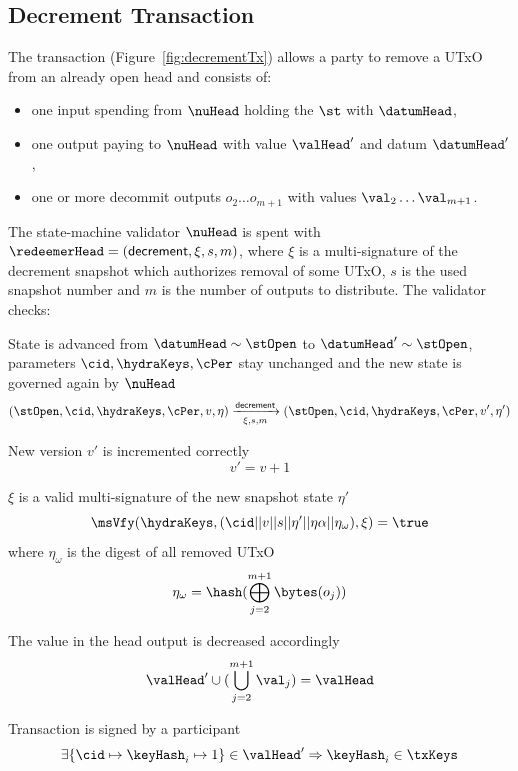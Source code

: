 \subsection{Decrement Transaction}\label{sec:decrement-tx}

\noindent The \mtxDecrement{} transaction (Figure~\ref{fig:decrementTx}) allows
a party to remove a UTxO from an already open head and consists of:

\begin{itemize}
  \item one input spending from $\nuHead$ holding the $\st$ with $\datumHead$,
  \item one output paying to $\nuHead$ with value $\valHead'$ and
  datum $\datumHead'$,
  \item one or more decommit outputs $o_{2} \dots o_{m+1}$ with values $\val_{2} \dots \val_{m+1} $.
\end{itemize}

\noindent The state-machine validator $\nuHead$ is spent with
$\redeemerHead = (\mathsf{decrement}, \xi, s, m)$, where $\xi$ is a multi-signature of
the decrement snapshot which authorizes removal of some UTxO, $s$ is the
used snapshot number and $m$ is the number of outputs to distribute. The
validator checks:
\begin{menumerate}
  \item State is advanced from $\datumHead \sim \stOpen$ to
  $\datumHead' \sim \stOpen$, parameters $\cid,\hydraKeys,\cPer$ stay
  unchanged and the new state is governed again by $\nuHead$
  \[
	(\stOpen,\cid,\hydraKeys,\cPer,v,\eta) \xrightarrow[\xi, s, m]{\mathsf{decrement}} (\stOpen,\cid,\hydraKeys,\cPer,v',\eta')
  \]
  \item New version $v'$ is incremented correctly
  \[
	v' = v + 1
  \]
  \item $\xi$ is a valid multi-signature of the new snapshot state $\eta'$
  \[
	\msVfy(\hydraKeys,(\cid || v || s || \eta' || \eta\alpha || \eta_\omega),\xi) = \true
  \]
  where $\eta_\omega$ is the digest of all removed UTxO
  \[
	\eta_\omega = \hash(\bigoplus_{j=2}^{m+1} \bytes(o_{j}))
  \]
  \item The value in the head output is decreased accordingly
  \[
	\valHead' \cup (\bigcup_{j=2}^{m+1} \val_{j}) = \valHead
  \]
  \item Transaction is signed by a participant
  \[
	\exists \{\cid \mapsto \keyHash_{i} \mapsto 1\} \in \valHead' \Rightarrow \keyHash_{i} \in \txKeys
  \]
\end{menumerate}

